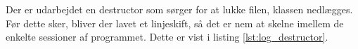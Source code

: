 

Der er udarbejdet en destructor som sørger for at lukke filen, klassen nedlægges. Før dette sker, bliver der lavet et linjeskift, så det er nem at skelne imellem de enkelte sessioner af programmet. Dette er vist i listing \ref{lst:log_destructor}.



\clearpage
